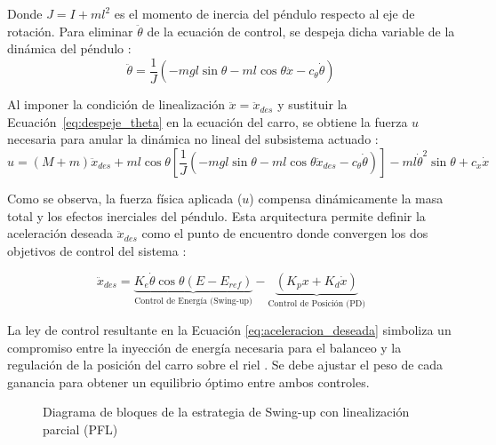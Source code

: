\documentclass[11pt,fleqn]{book} %
\begin{document}
Donde $J = I + ml^2$ es el momento de inercia del péndulo respecto al eje de rotación. Para eliminar $\ddot{\theta}$ de la ecuación de control, se despeja dicha variable de la dinámica del péndulo \cite{tedrake2023}:
\begin{equation}
		\ddot{\theta} = \frac{1}{J} \left( -mgl\sin\theta - ml\cos\theta\ddot{x} - c_{\theta}\dot{\theta} \right)
	\label{eq:despeje_theta}
\end{equation}

Al imponer la condición de linealización $\ddot{x} = \ddot{x}_{des}$ y sustituir la  Ecuación~\ref{eq:despeje_theta} en la ecuación del carro, se obtiene la fuerza $u$ necesaria para anular la dinámica no lineal del subsistema actuado \cite{tedrake2023}:
\begin{equation}
		u = (M + m)\ddot{x}_{des} + ml\cos\theta \left[ \frac{1}{J} (-mgl\sin\theta - ml\cos\theta\ddot{x}_{des} - c_{\theta}\dot{\theta}) \right] - ml\dot{\theta}^2\sin\theta + c_x\dot{x}
	\label{eq:ley_PFL}
\end{equation}


Como se observa, la fuerza física aplicada ($u$) compensa dinámicamente la masa total y los efectos inerciales del péndulo. Esta arquitectura permite definir la aceleración deseada $\ddot{x}_{des}$ como el punto de encuentro donde convergen los dos objetivos de control del sistema \cite{tedrake2023}:

\begin{equation}
	\ddot{x}_{des} = \underbrace{K_e \dot{\theta} \cos\theta (E - E_{ref})}_{\text{Control de Energía (Swing-up)}} - \underbrace{(K_p x + K_d \dot{x})}_{\text{Control de Posición (PD)}}
	\label{eq:aceleracion_deseada}
\end{equation}

La ley de control resultante en la Ecuación \ref{eq:aceleracion_deseada} simboliza un compromiso entre la inyección de energía necesaria para el balanceo y la regulación de la posición del carro sobre el riel \cite{tedrake2023}. Se debe ajustar el peso de cada ganancia para obtener un equilibrio óptimo entre ambos controles. 

\begin{figure}[ht]
	\centering
	\resizebox{\textwidth}{!}{%
		
	}
	\caption{Diagrama de bloques de la estrategia de Swing-up con linealización parcial (PFL) }
	\label{fig:PFL}
\end{figure}

\FloatBarrier
\end{document}
